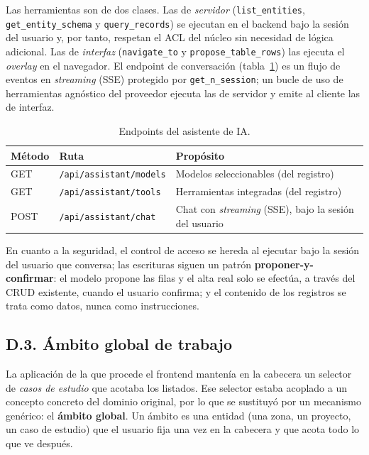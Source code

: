 Las herramientas son de dos clases. Las de \emph{servidor}
(\texttt{list\_entities}, \texttt{get\_entity\_schema} y
\texttt{query\_records}) se ejecutan en el backend bajo la sesión del usuario
y, por tanto, respetan el ACL del núcleo sin necesidad de lógica adicional. Las
de \emph{interfaz} (\texttt{navigate\_to} y \texttt{propose\_table\_rows}) las
ejecuta el \emph{overlay} en el navegador. El endpoint de conversación
(tabla~\ref{tab:asistente-endpoints}) es un flujo de eventos en \emph{streaming}
(SSE) protegido por \texttt{get\_n\_session}; un bucle de uso de herramientas
agnóstico del proveedor ejecuta las de servidor y emite al cliente las de
interfaz.

\begin{table}[!htbp]
\caption{Endpoints del asistente de IA.}
\label{tab:asistente-endpoints}
\centering
\begin{tabular}{|l|l|p{6cm}|}
\hline
\textbf{Método} & \textbf{Ruta} & \textbf{Propósito} \\ \hline
GET & \texttt{/api/assistant/models} & Modelos seleccionables (del registro) \\ \hline
GET & \texttt{/api/assistant/tools} & Herramientas integradas (del registro) \\ \hline
POST & \texttt{/api/assistant/chat} & Chat con \emph{streaming} (SSE), bajo la sesión del usuario \\ \hline
\end{tabular}
\end{table}

En cuanto a la seguridad, el control de acceso se hereda al ejecutar bajo la
sesión del usuario que conversa; las escrituras siguen un patrón
\textbf{proponer-y-confirmar}: el modelo propone las filas y el alta real
solo se efectúa, a través del CRUD existente, cuando el usuario confirma; y
el contenido de los registros se trata como datos, nunca como instrucciones.

\subsection{D.3. Ámbito global de trabajo}
\label{anexo:scopes}
La aplicación de la que procede el frontend mantenía en la cabecera un selector
de \emph{casos de estudio} que acotaba los listados. Ese selector estaba
acoplado a un concepto concreto del dominio original, por lo que se sustituyó
por un mecanismo genérico: el \textbf{ámbito global}. Un ámbito es una entidad
(una zona, un proyecto, un caso de estudio) que el usuario fija una vez en la
cabecera y que acota todo lo que ve después.


